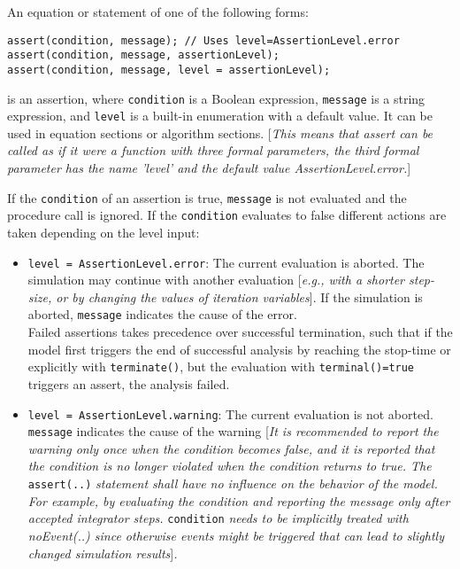 An equation or statement of one of the following forms:

\begin{lstlisting}[language=modelica]
assert(condition, message); // Uses level=AssertionLevel.error
assert(condition, message, assertionLevel);
assert(condition, message, level = assertionLevel);
\end{lstlisting}

is an assertion, where \lstinline!condition! is a Boolean expression, \lstinline!message! is a
string expression, and \lstinline!level! is a built-in enumeration with a default
value. It can be used in equation sections or algorithm sections.
{[}\emph{This means that assert can be called as if it were a function
with three formal parameters, the third formal parameter has the name
'level' and the default value AssertionLevel.error.}{]}

If the \lstinline!condition! of an assertion is true, \lstinline!message! is not evaluated and
the procedure call is ignored. If the \lstinline!condition! evaluates to false
different actions are taken depending on the level input:

\begin{itemize}
\item
  \lstinline!level = AssertionLevel.error!: The current evaluation is aborted. The
  simulation may continue with another evaluation {[}\emph{e.g., with a
  shorter step-size, or by changing the values of iteration
  variables}{]}. If the simulation is aborted, \lstinline!message! indicates the
  cause of the error.\\
  Failed assertions takes precedence over successful termination, such
  that if the model first triggers the end of successful analysis by
  reaching the stop-time or explicitly with \lstinline!terminate()!, but the
  evaluation with \lstinline!terminal()=true! triggers an assert, the analysis
  failed.
\item
  \lstinline!level = AssertionLevel.warning!: The current evaluation is not aborted.
  \lstinline!message! indicates the cause of the warning {[}\emph{It is recommended
  to report the warning only once when the condition becomes false, and
  it is reported that the condition is no longer violated when the
  condition returns to true. The} \lstinline!assert(..)! \emph{statement
  shall have no influence on the behavior of the model. For example, by
  evaluating the condition and reporting the message only after accepted
  integrator steps.} \lstinline!condition! \emph{needs to be implicitly treated with
  noEvent(..) since otherwise events might be triggered that can lead to
  slightly changed simulation results}{]}\emph{.}
\end{itemize}

